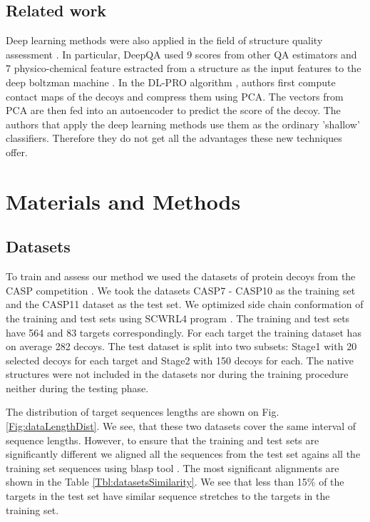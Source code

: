 \documentclass[a4paper,10pt]{article}
\begin{document}
\subsection{Related work}
Deep learning methods were also applied in the field of structure quality assessment \cite{}. In particular, 
DeepQA \cite{} used 9 scores from other QA estimators and 
7 physico-chemical feature estracted from a structure as the input features to the deep boltzman machine \cite{}. 
In the DL-PRO algorithm \cite{}, authors first compute contact maps of the decoys and compress them using PCA. 
The vectors from PCA are then fed into an autoencoder to predict the score of the decoy. 
The authors that apply the deep learning methods use them as the ordinary 'shallow' classifiers. 
Therefore they do not get all the advantages these new techniques offer.


\section{Materials and Methods}




\subsection{Datasets}
To train and assess our method we used the datasets of protein decoys from the CASP competition \cite{moult2014critical}. 
We took the datasets CASP7 - CASP10 as the training set and the CASP11 dataset as the test set.
We optimized side chain conformation of the training and test sets using SCWRL4 program \cite{krivov2009improved}.
The training and test sets have 564 and 83 targets correspondingly. For each target the training dataset has 
on average 282 decoys. The test dataset is split into two subsets: Stage1 with 20 selected decoys for each target and Stage2 with 150 decoys
for each. The native structures were not included in the datasets nor during the training procedure
neither during the testing phase. 

The distribution of target sequences lengths are shown on Fig. \ref{Fig:dataLengthDist}. We see,
that these two datasets cover the same interval of sequence lengths. However, to ensure that the training 
and test sets are significantly different we aligned all the sequences from the test set agains all the training 
set sequences using blasp tool \cite{altschul1990basic}. The most significant alignments are shown in the Table \ref{Tbl:datasetsSimilarity}.
We see that less than 15\% of the targets in the test set have similar sequence stretches to the targets in the training set.
\end{document}
